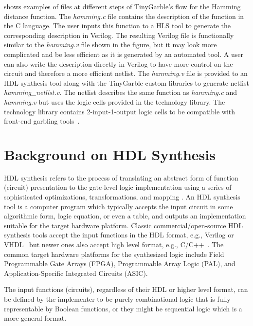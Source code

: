  shows examples of files at different steps of TinyGarble's flow for the Hamming distance function.
The \textsl{hamming.c} file contains the description of the function in the C language.
The user inputs this function to a HLS tool to generate the corresponding description in Verilog.
The resulting Verilog file is functionally similar to the \textsl{hamming.v} file shown in the figure, but it may look more complicated and be less efficient as it is generated by an automated tool.
A user can also write the description directly in Verilog to have more control on the circuit and therefore a more efficient netlist.
The \textsl{hamming.v} file is provided to an HDL synthesis tool along with the TinyGarble custom libraries to generate netlist \textsl{hamming\_netlist.v}.
The netlist describes the same function as \textsl{hamming.c} and \textsl{hamming.v} but uses the logic cells provided in the technology library.
The technology library contains 2-input-1-output logic cells to be compatible with front-end garbling tools~\cite{malkhi2004fairplay, bellare2013efficient}.

\section{Background on HDL Synthesis}
HDL synthesis refers to the process of translating an abstract form of  function (circuit) presentation to the gate-level logic implementation using a series of sophisticated optimizations, transformations, and mapping \cite{sentovich1992sis,micheli1994synthesis,devadas1994logic,brayton1987mis}.
An HDL synthesis tool is a computer program which typically accepts the input circuit in some algorithmic form, logic equation, or even a table, and outputs an implementation suitable for the target hardware platform.
Classic commercial/open-source HDL synthesis tools accept the input functions in the HDL format, e.g., Verilog or VHDL~\cite{tool:DesignCompiler,tool:ABC,tool:Encounter,tool:HDLdesigner,tool:PandA,decaluwe2004myhdl} but newer ones also accept high level format, e.g., C/C++~\cite{Gupta2004, tool:Vivado}.
The common target hardware platforms for the synthesized logic include Field Programmable Gate Arrays (FPGA), Programmable Array Logic (PAL), and Application-Specific Integrated Circuits (ASIC).

The input functions (circuits), regardless of their HDL or higher level format, can be defined by the implementer to be purely combinational logic that is fully representable by Boolean functions, or they might be sequential logic which is a more general format.


